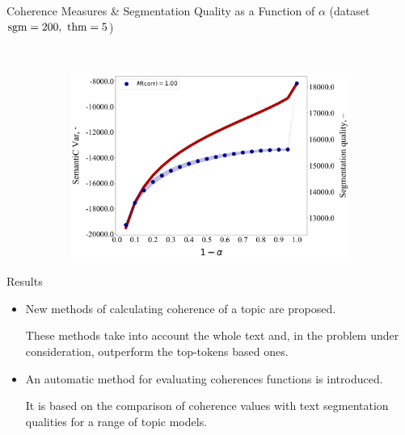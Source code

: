 \documentclass[russian]{beamer}
\begin{document}
\begin{frame}{Coherence Measures \& Segmentation Quality as a Function of $\alpha$ (dataset $\sgm=200,\ \thm=5$)}
\begin{figure}[h]
\begin{subfigure}[t]{0.48\textwidth}
    \end{subfigure}
    ~
    \begin{subfigure}[t]{0.48\textwidth}
      \includegraphics[width=\linewidth]{semantic_var-iteration.jpg}
    \end{subfigure}
  \end{figure}
\end{frame}

\begin{frame}{Results}
  \begin{itemize}
  \setlength\itemsep{0.5cm}
  \item
    New methods of calculating coherence of a topic are proposed.
    
    \smallskip
    
    These methods take into account the whole text and, in the problem under consideration, outperform the top-tokens based ones.
  \item
    An automatic method for evaluating coherences functions is introduced.
    
    \smallskip
    
    It is based on the comparison of coherence values with text segmentation qualities for a range of topic models.
  \end{itemize}
\end{frame}
\end{document}
